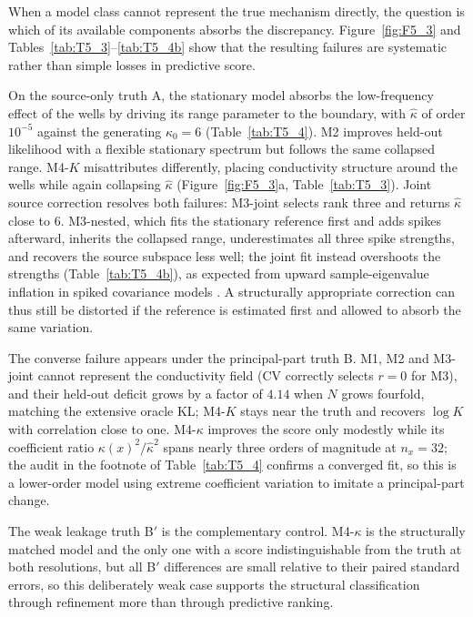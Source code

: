 \documentclass[11pt]{article}
\numberwithin{table}{section}
\numberwithin{figure}{section}
\begin{document}
When a model class cannot represent the true mechanism directly, the question is which of its available components absorbs the discrepancy. Figure~\ref{fig:F5_3} and Tables~\ref{tab:T5_3}--\ref{tab:T5_4b} show that the resulting failures are systematic rather than simple losses in predictive score.

On the source-only truth A, the stationary model absorbs the low-frequency effect of the wells by driving its range parameter to the boundary, with $\widehat\kappa$ of order $10^{-5}$ against the generating $\kappa_0=6$ (Table~\ref{tab:T5_4}). M2 improves held-out likelihood with a flexible stationary spectrum but follows the same collapsed range. M4-$K$ misattributes differently, placing conductivity structure around the wells while again collapsing $\widehat\kappa$ (Figure~\ref{fig:F5_3}a, Table~\ref{tab:T5_3}). Joint source correction resolves both failures: M3-joint selects rank three and returns $\widehat\kappa$ close to $6$. M3-nested, which fits the stationary reference first and adds spikes afterward, inherits the collapsed range, underestimates all three spike strengths, and recovers the source subspace less well; the joint fit instead overshoots the strengths (Table~\ref{tab:T5_4b}), as expected from upward sample-eigenvalue inflation in spiked covariance models \citep{BaikSilverstein2006}. A structurally appropriate correction can thus still be distorted if the reference is estimated first and allowed to absorb the same variation.

The converse failure appears under the principal-part truth B. M1, M2 and M3-joint cannot represent the conductivity field (CV correctly selects $r=0$ for M3), and their held-out deficit grows by a factor of $4.14$ when $N$ grows fourfold, matching the extensive oracle KL; M4-$K$ stays near the truth and recovers $\log K$ with correlation close to one. M4-$\kappa$ improves the score only modestly while its coefficient ratio $\kappa(x)^2/\widehat\kappa^2$ spans nearly three orders of magnitude at $n_x=32$; the audit in the footnote of Table~\ref{tab:T5_4} confirms a converged fit, so this is a lower-order model using extreme coefficient variation to imitate a principal-part change.

The weak leakage truth B$'$ is the complementary control. M4-$\kappa$ is the structurally matched model and the only one with a score indistinguishable from the truth at both resolutions, but all B$'$ differences are small relative to their paired standard errors, so this deliberately weak case supports the structural classification through refinement more than through predictive ranking.
\end{document}
